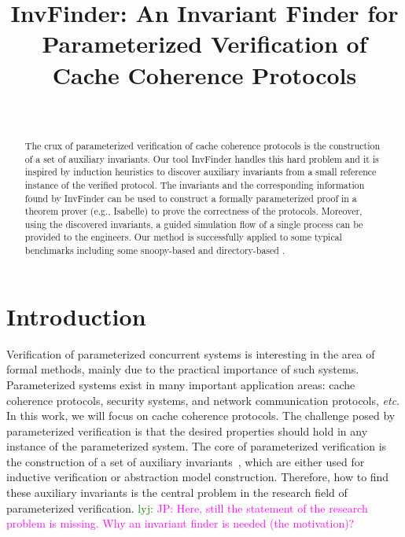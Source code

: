 \documentclass{llncs}
\newcommand\JP[1]{\textcolor{magenta}{JP: #1}}
\newcommand\lyj[1]{\textcolor{green}{lyj: #1}}
\begin{document}
\title{ {\sf InvFinder}: An Invariant Finder for Parameterized Verification of Cache Coherence Protocols}
\author{~}
\authorrunning{~}
\institute{~}

\maketitle

\begin{abstract}
The crux of parameterized verification of cache coherence protocols
is the construction of a set of auxiliary invariants. Our tool  {\sf
InvFinder} handles this hard problem and it is inspired by induction
heuristics to discover auxiliary invariants from a small reference
instance of the verified protocol. The invariants and the
corresponding information found by {\sf InvFinder} can be used to
construct a formally parameterized proof in a theorem prover (e.g.,
Isabelle) to prove the correctness of the protocols. Moreover, using
the discovered invariants, a guided simulation flow of a single
process can be provided to the engineers. Our method is successfully
applied to some typical benchmarks including some snoopy-based and
directory-based .

\end{abstract}

\section{Introduction}
Verification of parameterized concurrent systems is interesting in
the area of formal methods, mainly due to the practical importance
of such systems. Parameterized systems exist in many important
application areas: cache coherence protocols, security systems, and
network communication protocols, \emph{etc}. In this work, we will
focus on cache coherence protocols. The challenge posed by
parameterized verification is that the desired properties should
hold in any instance of the parameterized system. The core of
parameterized verification is the construction of a set of auxiliary
invariants~\cite{Pnueli2001,Chou2004,Pandav2005,cubicle2011}, which
are either used for inductive verification or abstraction model
construction. Therefore, how to find these auxiliary invariants is
the central problem in the research field of parameterized
verification. \lyj{}
\JP{Here, still the statement of the research problem is missing.
Why an invariant finder is needed (the motivation)?}
\end{document}
